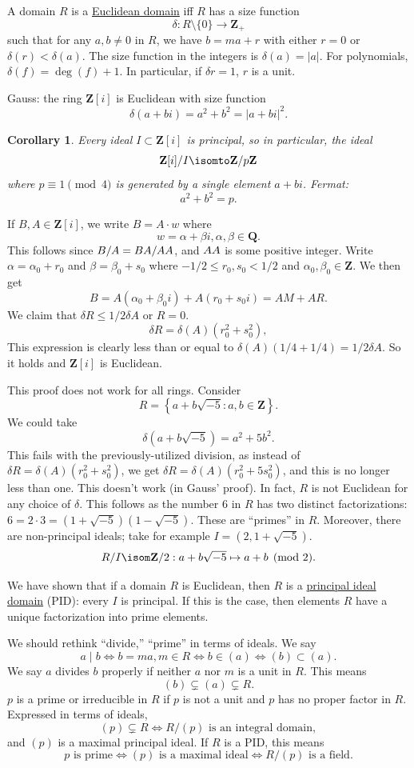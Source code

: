 \documentclass[11pt, oneside]{amsart}
\numberwithin{equation}{section}
\numberwithin{theorem}{section}
\newtheorem{corollary}[theorem]{Corollary}
\theoremstyle{definition}
\let\bar\relax
\def\Z{\mathbf{Z}}
\def\Q{\mathbf{Q}}
\begin{document}
{A domain $R$ is a \underline{Euclidean domain} iff $R$ has a size function 
$$
\delta : R \setminus \{0\} \to \Z_+
$$
such that for any $a,b\neq 0$ in $R$, we have $b=ma +r$ with either $r=0$ or $\delta(r) < \delta(a)$. The size function in the integers is $\delta(a) = |a|$. For polynomials, $\delta(f) = \deg(f) + 1$. In particular, if $\delta r = 1$, $r$ is a unit. 

Gauss: the ring $\Z[i]$ is Euclidean with size function
$$
\delta(a+bi) = a^2 + b^2 = |a+bi|^2.
$$
\begin{corollary}
Every ideal $I\subset \Z[i]$ is principal, so in particular, the ideal 
$$
\Z[i]/I \isomto \Z/p\Z
$$ 
where $p\equiv 1\pmod 4$ is generated by a single element $a+bi$. Fermat: 
$$
a^2 + b^2 = p.
$$
\end{corollary}

If $B, A\in \Z[i]$, we write $B = A\cdot w$ where 
$$
w=\alpha + \beta i, \alpha,\beta\in\Q.
$$ 
This follows since $B/A = B\bar A / A\bar A$, and $A\bar A$ is some positive integer. Write $\alpha = \alpha_0 + r_0$ and $\beta = \beta_0 + s_0$ where $-1/2\leqslant r_0,s_0 <1/2$ and $\alpha_0,\beta_0\in \Z$. We then get 
$$
B = A  (\alpha_0+\beta_0 i) + A(r_0 + s_0i) = AM + AR.
$$
We claim that $\delta R \leqslant 1/2\delta A$ or $R=0$. 
$$
\delta R = \delta (A)(r_0^2+s_0^2),
$$
This expression is clearly less than or equal to $\delta (A)(1/4+1/4) = 1/2\delta A$. So it holds and $\Z[i]$ is Euclidean.

This proof does not work for all rings. Consider 
$$
R = \left\{ a + b \sqrt{-5} : a,b\in \Z\right\}.
$$
We could take
$$
\delta\left(a + b\sqrt{-5}\right) = a^2 + 5b^2.
$$ 
This fails with the previously-utilized division, as instead of $\delta R = \delta (A)(r_0^2 + s_0^2)$, we get $\delta R = \delta (A)(r_0^2 + 5s_0^2)$, and this is no longer less than one. This doesn't work (in Gauss' proof). In fact, $R$ is not Euclidean for any choice of $\delta$. This follows as the number $6$ in $R$ has two distinct factorizations: $6 = 2\cdot 3 = \left( 1+\sqrt{-5} \right)\left( 1 - \sqrt{-5}\right)$. These are ``primes'' in $R$. Moreover, there are non-principal ideals; take for example $I = \left( 2, 1+\sqrt{-5} \right)$. 
$$
R/I \isom \Z/2 : a+b\sqrt{-5} \mapsto a + b \pmod 2.
$$

We have shown that if a domain $R$ is Euclidean, then $R$ is a \underline{principal ideal domain} (PID): every $I$ is principal. If this is the case, then elements $R$ have a unique factorization into prime elements. 

We should rethink ``divide,'' ``prime'' in terms of ideals. We say 
$$
a\mid b\iff b = ma, m\in R\iff b\in (a) \iff (b) \subset (a).
$$
We say $a$ divides $b$ properly if neither $a$ nor $m$ is a unit in $R$. This means 
$$
(b) \subsetneq (a) \subsetneq R.
$$
$p$ is a prime or irreducible in $R$ if $p$ is not a unit and $p$ has no proper factor in $R$. Expressed in terms of ideals,
$$
(p) \subsetneq R \iff R/(p) \textrm{ is an integral domain},
$$
and $(p)$ is a maximal principal ideal. If $R$ is a PID, this means
$$
p \textrm{ is prime} \iff (p) \textrm{ is a maximal ideal} \iff R/(p) \textrm{ is a field}.
$$

}
\end{document}
